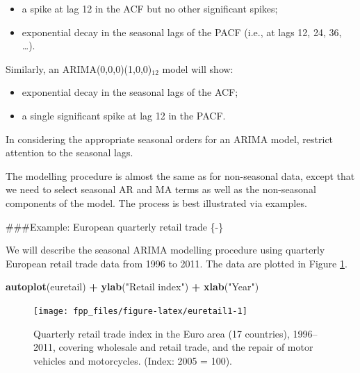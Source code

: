 \documentclass[]{book}
\newenvironment{Shaded}{\begin{snugshade}}{\end{snugshade}}
\newcommand{\KeywordTok}[1]{\textcolor[rgb]{0.13,0.29,0.53}{\textbf{#1}}}
\newcommand{\NormalTok}[1]{#1}
\newcommand{\OperatorTok}[1]{\textcolor[rgb]{0.81,0.36,0.00}{\textbf{#1}}}
\newcommand{\StringTok}[1]{\textcolor[rgb]{0.31,0.60,0.02}{#1}}
\providecommand{\tightlist}{%
  \setlength{\itemsep}{0pt}\setlength{\parskip}{0pt}}
\begin{document}
\begin{itemize}
\tightlist
\item
  a spike at lag 12 in the ACF but no other significant spikes;
\item
  exponential decay in the seasonal lags of the PACF (i.e., at lags 12, 24, 36, \ldots{}).
\end{itemize}

Similarly, an ARIMA(0,0,0)(1,0,0)\(_{12}\) model will show:

\begin{itemize}
\tightlist
\item
  exponential decay in the seasonal lags of the ACF;
\item
  a single significant spike at lag 12 in the PACF.
\end{itemize}

In considering the appropriate seasonal orders for an ARIMA model, restrict attention to the seasonal lags.

The modelling procedure is almost the same as for non-seasonal data, except that we need to select seasonal AR and MA terms as well as the non-seasonal components of the model. The process is best illustrated via examples.

\#\#\#Example: European quarterly retail trade \{-\}

We will describe the seasonal ARIMA modelling procedure using quarterly European retail trade data from 1996 to 2011. The data are plotted in Figure \ref{fig:euretail1}.

\begin{Shaded}
\begin{Highlighting}[]
\KeywordTok{autoplot}\NormalTok{(euretail) }\OperatorTok{+}\StringTok{ }\KeywordTok{ylab}\NormalTok{(}\StringTok{"Retail index"}\NormalTok{) }\OperatorTok{+}\StringTok{ }\KeywordTok{xlab}\NormalTok{(}\StringTok{"Year"}\NormalTok{)}
\end{Highlighting}
\end{Shaded}

\begin{figure}

{\centering \texttt{[image: fpp\_files/figure-latex/euretail1-1]} 

}

\caption{Quarterly retail trade index in the Euro area (17 countries), 1996--2011, covering wholesale and retail trade, and the repair of motor vehicles and motorcycles. (Index: 2005 = 100).}\label{fig:euretail1}
\end{figure}
\end{document}
